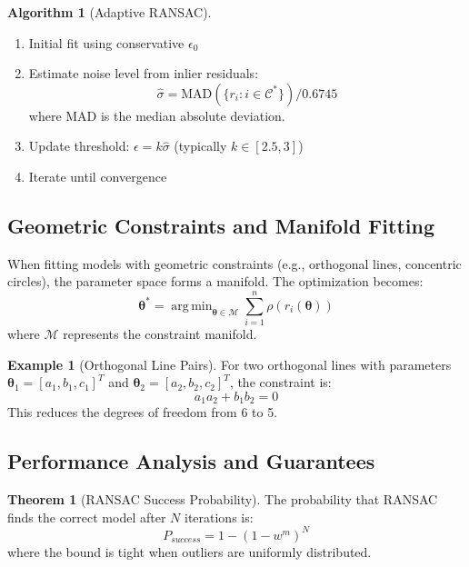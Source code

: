 \documentclass[12pt]{article}
\DeclareMathOperator{\argmin}{arg\,min}
\renewcommand{\vec}[1]{\mathbf{#1}}
\theoremstyle{definition}
\newtheorem{theorem}{Theorem}[section]
\newtheorem{example}{Example}[section]
\newtheorem{algorithm}{Algorithm}[section]
\begin{document}
\begin{algorithm}[Adaptive RANSAC]
    \begin{enumerate}
        \item Initial fit using conservative $\epsilon_0$
        \item Estimate noise level from inlier residuals:
              \begin{equation}
                  \hat{\sigma} = \text{MAD}(\{r_i : i \in \mathcal{C}^*\}) / 0.6745
              \end{equation}
              where MAD is the median absolute deviation.
        \item Update threshold: $\epsilon = k\hat{\sigma}$ (typically $k \in [2.5, 3]$)
        \item Iterate until convergence
    \end{enumerate}
\end{algorithm}

\subsection{Geometric Constraints and Manifold Fitting}

When fitting models with geometric constraints (e.g., orthogonal lines, concentric circles), the parameter space forms a manifold. The optimization becomes:
\begin{equation}
    \vec{\theta}^* = \argmin_{\vec{\theta} \in \mathcal{M}} \sum_{i=1}^n \rho(r_i(\vec{\theta}))
\end{equation}
where $\mathcal{M}$ represents the constraint manifold.

\begin{example}[Orthogonal Line Pairs]
    For two orthogonal lines with parameters $\vec{\theta}_1 = [a_1, b_1, c_1]^T$ and $\vec{\theta}_2 = [a_2, b_2, c_2]^T$, the constraint is:
    \begin{equation}
        a_1 a_2 + b_1 b_2 = 0
    \end{equation}
    This reduces the degrees of freedom from 6 to 5.
\end{example}

\subsection{Performance Analysis and Guarantees}

\begin{theorem}[RANSAC Success Probability]
    The probability that RANSAC finds the correct model after $N$ iterations is:
    \begin{equation}
        P_{success} = 1 - (1 - w^m)^N
    \end{equation}
    where the bound is tight when outliers are uniformly distributed.
\end{theorem}
\end{document}
